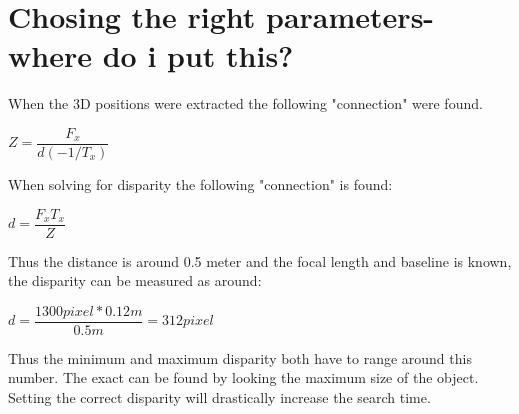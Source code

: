 \section{Chosing the right parameters- where do i put this?}

When the 3D positions were extracted the following "connection" were found.

$ Z = \dfrac{F_{x}}{ d(-1/T_{x})} $

When solving for disparity the following "connection" is found:

$ d = \dfrac{F_{x}T_{x}}{ Z} $

Thus the distance is around 0.5 meter and the focal length and baseline is known, the disparity can be measured as around:

$ d = \dfrac{1300pixel*0.12m}{0.5m} = 312pixel $

Thus the minimum and maximum disparity both have to range around this number. The exact can be found by looking the maximum size of the object. Setting the correct disparity will drastically increase the search time.